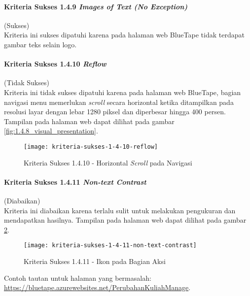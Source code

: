 \paragraph{Kriteria Sukses 1.4.9 \textit{Images of Text (No Exception)}}
\label{par:kepatuhan_bluetape_kriteria_sukses_1.4.9}
(Sukses)\\

Kriteria ini sukses dipatuhi karena pada halaman web BlueTape tidak terdapat gambar teks selain logo.

\paragraph{Kriteria Sukses 1.4.10 \textit{Reflow}}
\label{par:kepatuhan_bluetape_kriteria_sukses_1.4.10}
(Tidak Sukses)\\

Kriteria ini tidak sukses dipatuhi karena pada halaman web BlueTape, bagian navigasi menu memerlukan \textit{scroll} secara horizontal ketika ditampilkan pada resolusi layar dengan lebar 1280 piksel dan diperbesar hingga 400 persen. Tampilan pada halaman web dapat dilihat pada gambar \ref{fig:1.4.8_visual_presentation}.

\begin{figure}[H]
    \centering  
    \texttt{[image: kriteria-sukses-1-4-10-reflow]}  
    \caption[Kriteria Sukses 1.4.10 - Horizontal \textit{Scroll} pada Navigasi]{Kriteria Sukses 1.4.10 - Horizontal \textit{Scroll} pada Navigasi}
    \label{fig:1.4.10_reflow}  
\end{figure} 

\paragraph{Kriteria Sukses 1.4.11 \textit{Non-text Contrast}}
\label{par:kepatuhan_bluetape_kriteria_sukses_1.4.11}
(Diabaikan)\\

Kriteria ini diabaikan karena terlalu sulit untuk melakukan pengukuran dan mendapatkan hasilnya. Tampilan pada halaman web dapat dilihat pada gambar \ref{fig:1.4.11_non_text_contrast}.

\begin{figure}[H]
	\centering  
	\texttt{[image: kriteria-sukses-1-4-11-non-text-contrast]}  
    \caption[Kriteria Sukses 1.4.11 - Ikon pada Bagian Aksi]{Kriteria Sukses 1.4.11 - Ikon pada Bagian Aksi}
    \label{fig:1.4.11_non_text_contrast}  
\end{figure} 
Contoh tautan untuk halaman yang bermasalah: \url{https://bluetape.azurewebsites.net/PerubahanKuliahManage}.

